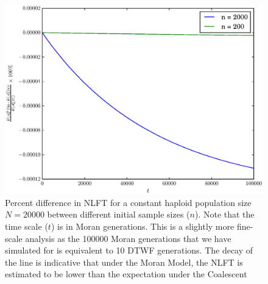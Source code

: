 \documentclass[11pt]{article}
\begin{document}
\begin{center}
	\begin{figure}[!ht]
		\includegraphics[scale=0.85]{../plots/moran_figure2}
		\caption{Percent difference in NLFT for a constant haploid population size $N = 20000$ between different initial sample sizes ($n$). Note that the time scale ($t$) is in Moran generations. This is a slightly more fine-scale analysis as the 100000 Moran generations that we have simulated for is equivalent to 10 DTWF generations. The decay of the line is indicative that under the Moran Model, the NLFT is estimated to be lower than the expectation under the Coalescent}
	\end{figure}
\end{center}
\end{document}
